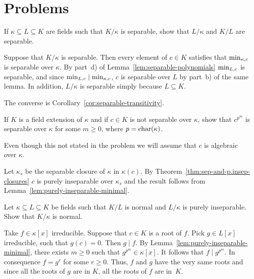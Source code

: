 \section{Problems}

\begin{probl}
    If\/ $\kappa \subseteq L \subseteq K$ are fields such that\/ $K / \kappa$ is separable, show that\/ $L / \kappa$ and\/ $K / L$ are separable.
\end{probl}

\begin{solution}
    Suppose that $K/\kappa$ is separable. Then every element of $c\in K$ satisfies that $\operatorname{min}_{\kappa,c}$ is separable over $\kappa$. By part~d) of Lemma~\ref{lem:separable-polynomials} $\operatorname{min}_{L,c}$ is separable, and since $\operatorname{min}_{L,c}\mid\operatorname{min}_{\kappa,c}$, $c$ is separable over $L$ by part~b) of the same lemma. In addition, $L/\kappa$ is separable simply because $L\subseteq K$.

    The converse is Corollary~\ref{cor:separable-transitivity}.
\end{solution}

\begin{probl}
    If\/ $K$ is a field extension of\/ $\kappa$ and if\/ $c \in K$ is not separable over\/ $\kappa$, show that\/ $c^{p^m}$ is separable over\/ $\kappa$ for some\/ $m \ge 0$, where\/ $p = \operatorname{char}(\kappa)$.
\end{probl}

\begin{solution}
    Even though this not stated in the problem we will assume that $c$ is algebraic over $\kappa$.
    
    Let $\kappa_s$ be the separable closure of $\kappa$ in $\kappa(c)$. By Theorem~\ref{thm:sep-and-p.insep-closures} $c$ is purely inseparable over $\kappa_s$ and the result follows from Lemma~\ref{lem:purely-inseparable-minimal}.
\end{solution}

\begin{probl}\label{probl:normal+p.insep-is-normal}
    Let\/ $\kappa \subseteq L \subseteq K$ be fields such that\/ $K / L$ is normal and\/ $L / \kappa$ is purely inseparable. Show that\/ $K / \kappa$ is normal.
\end{probl}

\begin{solution}
    Take $f\in\kappa[x]$ irreducible. Suppose that $c\in K$ is a root of $f$. Pick $g\in L[x]$ irreducible, such that $g(c)=0$. Then $g\mid f$. By Lemma~\ref{lem:purely-inseparable-minimal}, there exists $m\ge0$ such that $g^{p^m}\in\kappa[x]$. It follows that $f\mid g^{p^m}$. In consequence $f=g^r$ for some $r\ge0$. Thus, $f$ and $g$ have the very same roots and since all the roots of $g$ are in $K$, all the roots of $f$ are in~$K$.
\end{solution}

